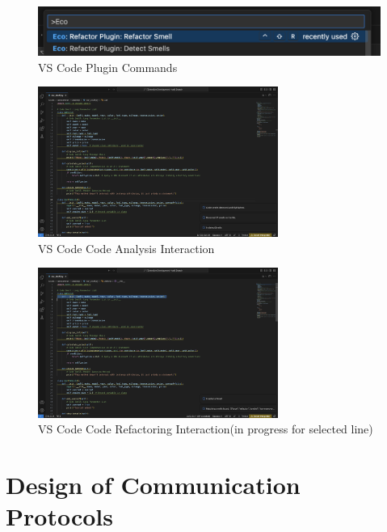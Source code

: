 \documentclass[12pt, titlepage]{article}
\begin{document}
  \begin{figure}[H]
  \centering
  \includegraphics[width=\textwidth]{../../Images/VSPluginCommands.png}
  \caption{VS Code Plugin Commands}
  \label{FigUH}
  \end{figure}
  
  \begin{figure}[H]
  \centering
  \includegraphics[width=0.7\textwidth]{../../Images/VSPluginDetectMode.png}
  \caption{VS Code Code Analysis Interaction}
  \label{FigUH}
  \end{figure}
  
  \begin{figure}[H]
  \centering
  \includegraphics[width=0.7\textwidth]{../../Images/VSPluginRefactorMode.png}
  \caption{VS Code Code Refactoring Interaction(in progress for selected line)}
  \label{FigUH}
  \end{figure}


\section{Design of Communication Protocols}
\end{document}
